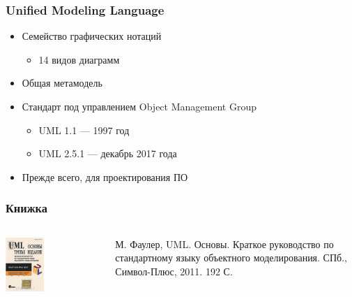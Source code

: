 \documentclass{../../slides-style}
\begin{document}
    \begin{frame}
        \frametitle{Unified Modeling Language}
        \begin{itemize}
            \item Семейство графических нотаций
            \begin{itemize}
                \item 14 видов диаграмм
            \end{itemize}
            \item Общая метамодель
            \item Стандарт под управлением Object Management Group
            \begin{itemize}
                \item UML 1.1 --- 1997 год
                \item UML 2.5.1 --- декабрь 2017 года
            \end{itemize}
            \item Прежде всего, для проектирования ПО
        \end{itemize}
    \end{frame}

    \begin{frame}
        \frametitle{Книжка}
        \begin{columns}
            \begin{column}{0.5\textwidth}
                \begin{center}
                    \includegraphics[width=0.4\textwidth]{umlBookCover.png}
                \end{center}
            \end{column}
            \begin{column}{0.5\textwidth}
                М. Фаулер, UML. Основы. Краткое руководство по стандартному языку объектного моделирования. СПб., Символ-Плюс, 2011. 192 С.
            \end{column}
        \end{columns}
    \end{frame}
\end{document}
